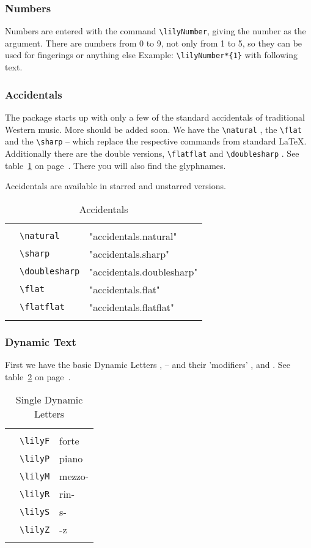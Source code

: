 \documentclass{article}
\newcommand*{\cmd}[1]{\texttt{\textbackslash #1}}
\newcommand{\tmpCaption}{} %
\newcommand{\tmpLabel}{}
\newenvironment{reftable}[2]
	{%
		\renewcommand{\tmpCaption}{#1}
		\renewcommand{\tmpLabel}{#2}
		\begin{table}[ht]
		\begin{center}
		\begin{tabular}[t]{lll}
		\hline
		&\\
	}
	{%
		&\\
		\hline
		\end{tabular}
		\caption{\tmpCaption}
		\label{table:\tmpLabel}
		\end{center}
		\end{table}
	}
\begin{document}
\subsubsection{Numbers}
Numbers are entered with the command \cmd{lilyNumber}, giving the number as the argument. There are numbers from 0 to 9, not only from 1 to 5, so they can be used for fingerings or anything else Example: \cmd{lilyNumber*\{1\}}  with following text.


\subsubsection{Accidentals}
The package starts up with only a few of the standard accidentals of traditional Western music. More should be added soon. We have the \cmd{natural} \natural, the \cmd{flat} \flat* and the \cmd{sharp} \sharp* -- which replace the respective commands from standard \LaTeX. Additionally there are the double versions, \cmd{flatflat} \flatflat* and \cmd{doublesharp} \doublesharp. See table~\ref{table:accidentals} on page~\pageref{table:accidentals}. There you will also find the glyphnames.

Accidentals are available in starred and unstarred versions.

\begin{reftable}{Accidentals}{accidentals}
\natural & \cmd{natural} & "accidentals.natural"\\
\sharp & \cmd{sharp} & "accidentals.sharp"\\
\doublesharp & \cmd{doublesharp} & "accidentals.doublesharp"\\
\flat & \cmd{flat} & "accidentals.flat"\\
\flatflat & \cmd{flatflat} & "accidentals.flatflat"\\
\end{reftable}



\subsubsection{Dynamic Text}
First we have the basic Dynamic Letters \lilyP, \lilyF* -- and their 'modifiers'
\lilyM, \lilyS* and \lilyZ. See table~\ref{table:singleDynLetters} on page~\pageref{table:singleDynLetters}.

\begin{reftable}{Single Dynamic Letters}{singleDynLetters}
\lilyF* & \cmd{lilyF} & forte\\
\lilyP* & \cmd{lilyP} & piano\\
\lilyM* & \cmd{lilyM} & mezzo-\\
\lilyR* & \cmd{lilyR} & rin-\\
\lilyS* & \cmd{lilyS} & s-\\
\lilyZ* & \cmd{lilyZ} & -z\\
\end{reftable}
\end{document}
